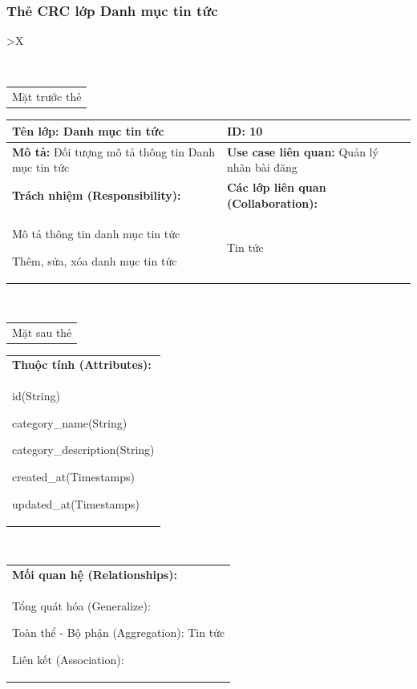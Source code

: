   \subsubsection{Thẻ CRC lớp Danh mục tin tức}
  \begin{xltabular}{\textwidth}{
    >{\centering\arraybackslash}X 
  }
  \caption{\bfseries \fontsize{12pt}{0pt}\selectfont Thẻ CRC lớp Danh mục tin tức}
  \\
  \begin{tabularx}{0.9\textwidth}{X}
    Mặt trước thẻ
  \end{tabularx}
  \begin{tabularx}{0.9\textwidth}{|X|X|}
    \hline
    \textbf{Tên lớp:} Danh mục tin tức & \textbf{ID:} 10 \\
    \hline
    \textbf{Mô tả:} Đối tượng mô tả thông tin Danh mục tin tức & \textbf{Use case liên quan:}  Quản lý nhãn bài đăng\\
    \hline
    \textbf{Trách nhiệm (Responsibility):} & \textbf{Các lớp liên quan (Collaboration):} \\
    Mô tả thông tin danh mục tin tức

    Thêm, sửa, xóa danh mục tin tức
    & 
    Tin tức
    \\
    \hline
  \end{tabularx}
  \\ 
  \begin{tabularx}{0.9\textwidth}{X}
    Mặt sau thẻ
  \end{tabularx} 
  \begin{tabularx}{0.9\textwidth}{|X|}
    \hline
    \textbf{Thuộc tính (Attributes):} \\
    id(String) 
    
    category\_name(String)

    category\_description(String)

    created\_at(Timestamps)

    updated\_at(Timestamps)
    \\
    \hline
  \end{tabularx}
  \\     
  \begin{tabularx}{0.9\textwidth}{|X|}
    \textbf{Mối quan hệ (Relationships):} \\
    Tổng quát hóa (Generalize):  

    Toàn thể - Bộ phận (Aggregation): Tin tức
    
    Liên kết (Association): 
    \\
    \hline
  \end{tabularx}
  \end{xltabular}

